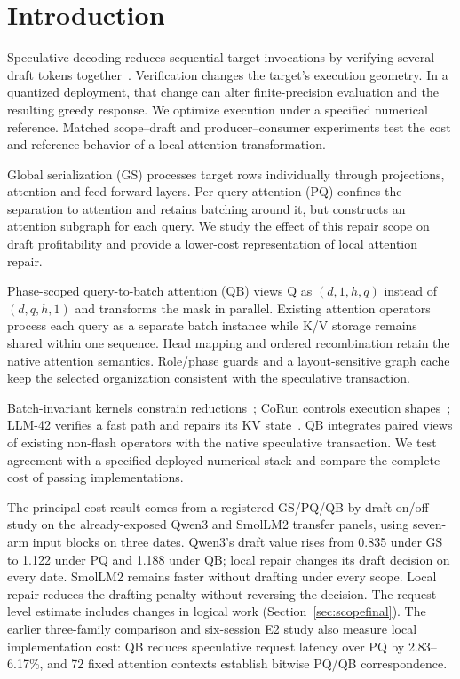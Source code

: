\section{Introduction}
Speculative decoding reduces sequential target invocations by verifying several draft tokens together~\cite{leviathan2023,chen2023}. Verification changes the target's execution geometry. In a quantized deployment, that change can alter finite-precision evaluation and the resulting greedy response. We optimize execution under a specified numerical reference. Matched scope--draft and producer--consumer experiments test the cost and reference behavior of a local attention transformation.

Global serialization (GS) processes target rows individually through projections, attention and feed-forward layers. Per-query attention (PQ) confines the separation to attention and retains batching around it, but constructs an attention subgraph for each query. We study the effect of this repair scope on draft profitability and provide a lower-cost representation of local attention repair.

Phase-scoped query-to-batch attention (QB) views Q as $(d,1,h,q)$ instead of $(d,q,h,1)$ and transforms the mask in parallel. Existing attention operators process each query as a separate batch instance while K/V storage remains shared within one sequence. Head mapping and ordered recombination retain the native attention semantics. Role/phase guards and a layout-sensitive graph cache keep the selected organization consistent with the speculative transaction.

Batch-invariant kernels constrain reductions~\cite{thinkingmachines}; CoRun controls execution shapes~\cite{corun}; LLM-42 verifies a fast path and repairs its KV state~\cite{llm42}. QB integrates paired views of existing non-flash operators with the native speculative transaction. We test agreement with a specified deployed numerical stack and compare the complete cost of passing implementations.

The principal cost result comes from a registered GS/PQ/QB by draft-on/off study on the already-exposed Qwen3 and SmolLM2 transfer panels, using seven-arm input blocks on three dates. Qwen3's draft value rises from 0.835 under GS to 1.122 under PQ and 1.188 under QB; local repair changes its draft decision on every date. SmolLM2 remains faster without drafting under every scope. Local repair reduces the drafting penalty without reversing the decision. The request-level estimate includes changes in logical work (Section~\ref{sec:scopefinal}). The earlier three-family comparison and six-session E2 study also measure local implementation cost: QB reduces speculative request latency over PQ by 2.83--6.17\%, and 72 fixed attention contexts establish bitwise PQ/QB correspondence.

